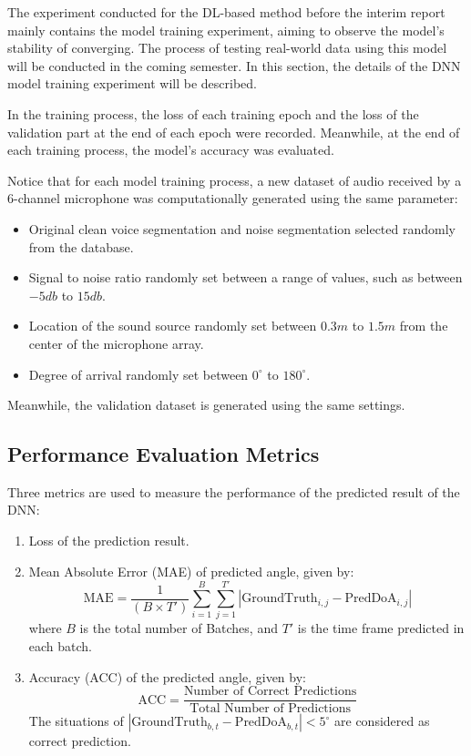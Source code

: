 The experiment conducted for the DL-based method before the interim report mainly contains the model training experiment, aiming to observe the model's stability of converging. The process of testing real-world data using this model will be conducted in the coming semester. In this section, the details of the DNN model training experiment will be described.

In the training process, the loss of each training epoch and the loss of the validation part at the end of each epoch were recorded. Meanwhile, at the end of each training process, the model's accuracy was evaluated.

Notice that for each model training process, a new dataset of audio received by a 6-channel microphone was computationally generated using the same parameter:
\begin{itemize}
    \item Original clean voice segmentation and noise segmentation selected randomly from the database.
    \item Signal to noise ratio randomly set between a range of values, such as between \(-5 db\) to \(15 db\).
    \item Location of the sound source randomly set between \(0.3m\) to \(1.5m\) from the center of the microphone array.
    \item Degree of arrival randomly set between \(0^{\circ}\) to \(180^\circ\).
\end{itemize}
Meanwhile, the validation dataset is generated using the same settings.

\subsection*{Performance Evaluation Metrics}
Three metrics are used to measure the performance of the predicted result of the DNN:
\begin{enumerate}
    \item Loss of the prediction result.
    \item Mean Absolute Error (MAE) of predicted angle, given by:
    \[
        \text{MAE} = \frac{1}{(B\times T')} \sum_{i = 1}^{B}\sum_{j = 1}^{T'} |\text{GroundTruth}_{i,j}-\text{PredDoA}_{i,j}|
    \]
    where \(B\) is the total number of Batches, and \(T'\) is the time frame predicted in each batch.
    \item Accuracy (ACC) of the predicted angle, given by:
    \[
        \text{ACC} = \frac{\text{Number of Correct Predictions}}{\text{Total Number of Predictions}}
    \]
    The situations of \(|\text{GroundTruth}_{b,t}-\text{PredDoA}_{b,t}| < 5^\circ\) are considered as correct prediction.
\end{enumerate}

